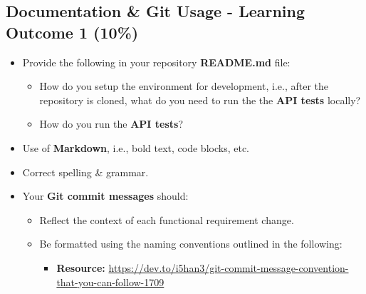 \documentclass{article}
\begin{document}
\subsection*{Documentation \& Git Usage - Learning Outcome 1 (10\%)}
\begin{itemize}
  \item Provide the following in your repository \textbf{README.md} file:
        \begin{itemize}
          \item How do you setup the environment for development, i.e., after the repository is cloned, what do you need to run the the \textbf{API tests} locally?
          \item How do you run the \textbf{API tests}?
        \end{itemize}
  \item Use of \textbf{Markdown}, i.e., bold text, code blocks, etc.
  \item Correct spelling \& grammar.
  \item Your \textbf{Git commit messages} should:
        \begin{itemize}
          \item Reflect the context of each functional requirement change.
          \item Be formatted using the naming conventions outlined in the following:
                \begin{itemize}
                  \item \textbf{Resource:} \small\href{https://dev.to/i5han3/git-commit-message-convention-that-you-can-follow-1709}{https://dev.to/i5han3/git-commit-message-convention-that-you-can-follow-1709}
                \end{itemize}
        \end{itemize}
\end{itemize}
\end{document}
